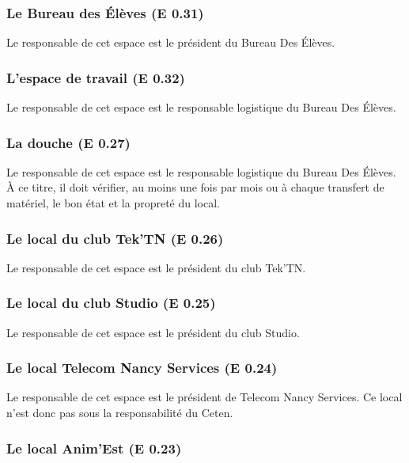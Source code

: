 \documentclass{article} %
\begin{document}
			\subsubsection{Le Bureau des Élèves (E 0.31)}

				Le responsable de cet espace est le président du Bureau Des
				Élèves.

			\subsubsection{L’espace de travail (E 0.32)}

			Le responsable de cet espace est le responsable logistique du
			Bureau Des Élèves.

			\subsubsection{La douche (E 0.27)}

				Le responsable de cet espace est le responsable logistique du
				Bureau Des Élèves. À ce titre, il doit vérifier, au moins une
				fois par mois ou à chaque transfert de matériel, le bon état et
				la propreté du local.

			\subsubsection{Le local du club Tek’TN (E 0.26)}

				Le responsable de cet espace est le président du club Tek’TN. 

			\subsubsection{Le local du club Studio (E 0.25)}

				Le responsable de cet espace est le président du club Studio. 

			\subsubsection{Le local Telecom Nancy Services (E 0.24)}

				Le responsable de cet espace est le président de Telecom Nancy
				Services. Ce local n’est donc pas sous la responsabilité du
				Ceten.

			\subsubsection{Le local Anim’Est (E 0.23)}
\end{document}
